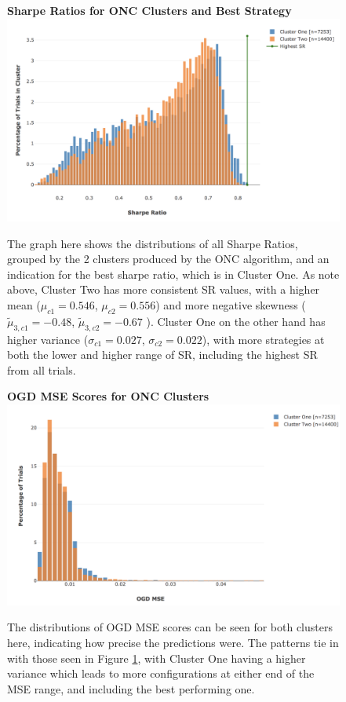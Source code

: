 \documentclass[a4paper,11pt,oneside]{article}
\theoremstyle{plain}
\theoremstyle{definition}
\begin{document}
	\begin{figure}[H]
		\centering
		\textbf{Sharpe Ratios for ONC Clusters and Best Strategy}
		\includegraphics[scale=0.35]{images/results/dsr/cluster_distributions.png} 
		\caption[Sharpe Ratios for ONC Clusters and Best Strategy]{
			 The graph here shows the distributions of all Sharpe Ratios, grouped by the 2 clusters produced by the ONC algorithm, and an indication for the best sharpe ratio, which is in Cluster One. As note above, Cluster Two has more consistent SR values, with a higher mean ($\mu_{c1} = 0.546$, $\mu_{c2} = 0.556$) and more negative skewness ($\tilde{\mu}_{3,c1} = -0.48$, $\tilde{\mu}_{3,c2} = -0.67$ ). Cluster One on the other hand has higher variance ($\sigma_{c1} = 0.027$, $\sigma_{c2} = 0.022$), with more strategies at both the lower and higher range of SR, including the highest SR from all trials.}
		\label{figure-dsr_clusters}
	\end{figure}

	\begin{figure}[H]
		\centering
		\textbf{OGD MSE Scores for ONC Clusters}
		\includegraphics[scale=0.35]{images/results/dsr/cluster_distributions_mse.png} 
		\caption[OGD MSE Scores for ONC Clusters]{
			The distributions of OGD MSE scores can be seen for both clusters here, indicating how precise the predictions were. The patterns tie in with those seen in Figure \ref{figure-dsr_clusters}, with Cluster One having a higher variance which leads to more configurations at either end of the MSE range, and including the best performing one.}
		\label{figure-dsr_clusters_mse}
	\end{figure}
	
\end{document}
